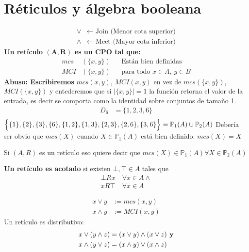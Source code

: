 \documentclass[../main.tex]{subfiles}
\begin{document}
\chapter{Réticulos y álgebra booleana}%
\thispagestyle{fancy}

\begin{align*}
	\vee &\longleftarrow\text{ Join (Menor cota superior)}\\
	\wedge &\longleftarrow\text{ Meet (Mayor cota inferior)}
\end{align*}
\textbf{Un retículo $\mathbf{(A,R)}$ es un $\mathbf{CPO}$ tal que:}
\begin{align*}
	mcs&(\{x,y\}) && \text{Están bien definidas}\\
	MCI&(\{x,y\}) && \text{para todo $x\in A$, $y \in B$}
\end{align*}
\textbf{Abuso: Escribiremos}
$mcs(x,y)$, $MCI(x,y)$ en vez de $mcs(\{x,y\})$, $MCI(\{x,y\})$
y entederemos que si $|\{x,y\}|=1$ la función retorna el valor de la entrada,
es decir se comporta como la identidad sobre conjuntos de tamaño 1.
\begin{align*}
	D_6 &= \{1,2,3,6\}\\
\end{align*}
$\Big{\{}\{1\},\{2\},\{3\},\{6\},\{1,2\},\{1,3\},\{2,3\},\{2,6\},\{3,6\}\Big{\}}
=\mathbb{P}_1(A)\cup\mathbb{P}_2(A)$
Debería ser obvio que $mcs(X)$ cuando $X\in \mathbb{P}_1(A)$
está bien definido.
$mcs(X)=X$

Si $(A,R)$ es un retículo eso quiere decir que $mcs(X)\in \mathbb{P}_1(A)\forall X \in
\mathbb{P}_2(A)$

\textbf{Un retículo es acotado}
si existen $\bot , \top \in A$ tales que
\begin{align*}
	\bot Rx \ &\forall x \in A\wedge\\
	xR\top \  &\forall x \in A
\end{align*}

\begin{align*}
	x\vee y &:=mcs(x,y)\\
	x\wedge y &:=MCI(x,y)
\end{align*}
Un retículo es distributivo:
\begin{align*}
	x\vee(y\wedge z) &= (x\vee y)\wedge(x\vee z) \text{\textbf{\ y}}\\
	x\wedge(y\vee z) &= (x\wedge y)\vee (x\wedge z)
\end{align*}
\end{document}

